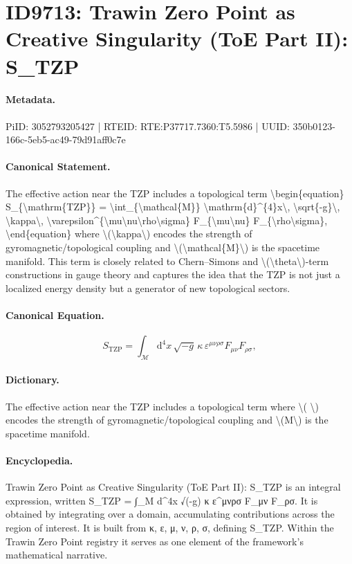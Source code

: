 \section*{ID9713: Trawin Zero Point as Creative Singularity (ToE Part II): S\_TZP}
\paragraph{Metadata.}
PiID: 3052793205427 | RTEID: RTE:P37717.7360:T5.5986 | UUID: 350b0123-166c-5eb5-ac49-79d91aff0c7e

\paragraph{Canonical Statement.}
The effective action near the TZP includes a topological term \textbackslash{}begin\{equation\} S\_\{\textbackslash{}mathrm\{TZP\}\} = \textbackslash{}int\_\{\textbackslash{}mathcal\{M\}\} \textbackslash{}mathrm\{d\}\textasciicircum{}\{4\}x\textbackslash{}, \textbackslash{}sqrt\{-g\}\textbackslash{}, \textbackslash{}kappa\textbackslash{}, \textbackslash{}varepsilon\textasciicircum{}\{\textbackslash{}mu\textbackslash{}nu\textbackslash{}rho\textbackslash{}sigma\} F\_\{\textbackslash{}mu\textbackslash{}nu\} F\_\{\textbackslash{}rho\textbackslash{}sigma\}, \textbackslash{}end\{equation\} where \textbackslash{}(\textbackslash{}kappa\textbackslash{}) encodes the strength of gyromagnetic/topological coupling and \textbackslash{}(\textbackslash{}mathcal\{M\}\textbackslash{}) is the spacetime manifold. This term is closely related to Chern--Simons and \textbackslash{}(\textbackslash{}theta\textbackslash{})-term constructions in gauge theory and captures the idea that the TZP is not just a localized energy density but a generator of new topological sectors.

\paragraph{Canonical Equation.}
\[
S_{\mathrm{TZP}} = \int_{\mathcal{M}} \mathrm{d}^{4}x\, \sqrt{-g}\, \kappa\, \varepsilon^{\mu\nu\rho\sigma} F_{\mu\nu} F_{\rho\sigma},
\]

\paragraph{Dictionary.}
The effective action near the TZP includes a topological term where \textbackslash{}( \textbackslash{}) encodes the strength of gyromagnetic/topological coupling and \textbackslash{}(M\textbackslash{}) is the spacetime manifold.

\paragraph{Encyclopedia.}
Trawin Zero Point as Creative Singularity (ToE Part II): S\_TZP is an integral expression, written S\_TZP = ∫\_M d\textasciicircum{}4x √(-g) κ ε\textasciicircum{}μνρσ F\_μν F\_ρσ. It is obtained by integrating over a domain, accumulating contributions across the region of interest. It is built from κ, ε, μ, ν, ρ, σ, defining S\_TZP. Within the Trawin Zero Point registry it serves as one element of the framework's mathematical narrative.
